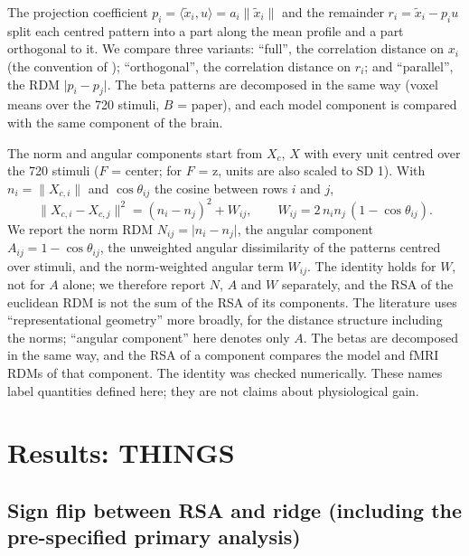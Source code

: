 \documentclass[10pt]{article}
\begin{document}
The projection coefficient $p_i = \langle \tilde{x}_i, u \rangle = a_i \lVert \tilde{x}_i \rVert$
and the remainder $r_i = \tilde{x}_i - p_i u$ split each centred pattern into a part along
the mean profile and a part orthogonal to it. We compare three variants: ``full'', the
correlation distance on $x_i$ (the convention of \citet{evalres}); ``orthogonal'', the
correlation distance on $r_i$; and ``parallel'', the RDM $\lvert p_i - p_j \rvert$. The beta
patterns are decomposed in the same way (voxel means over the 720 stimuli, $B$ = paper),
and each model component is compared with the same component of the brain.

The norm and angular components start from $X_c$, $X$ with every unit centred over the
720 stimuli ($F$ = center; for $F$ = z, units are also scaled to SD 1). With
$n_i = \lVert X_{c,i} \rVert$ and $\cos\theta_{ij}$ the cosine between rows $i$ and $j$,
\begin{equation}
  \lVert X_{c,i} - X_{c,j} \rVert^2 = (n_i - n_j)^2 + W_{ij}, \qquad
  W_{ij} = 2\, n_i n_j \,(1 - \cos\theta_{ij}).
\end{equation}
We report the norm RDM $N_{ij} = \lvert n_i - n_j \rvert$, the angular component
$A_{ij} = 1 - \cos\theta_{ij}$, the unweighted angular dissimilarity of the patterns
centred over stimuli, and the norm-weighted angular term $W_{ij}$. The identity holds for
$W$, not for $A$ alone; we therefore report $N$, $A$ and $W$ separately, and the RSA of the
euclidean RDM is not the sum of the RSA of its components. The literature uses
``representational geometry'' more broadly, for the distance structure including the
norms; ``angular component'' here denotes only $A$. The betas are decomposed in the same
way, and the RSA of a component compares the model and fMRI RDMs of that component. The
identity was checked numerically. These names label quantities defined here; they are
not claims about physiological gain.








\section{Results: THINGS}
\subsection{Sign flip between RSA and ridge (including the pre-specified primary analysis)}
\label{sec:signflip}

\end{document}
